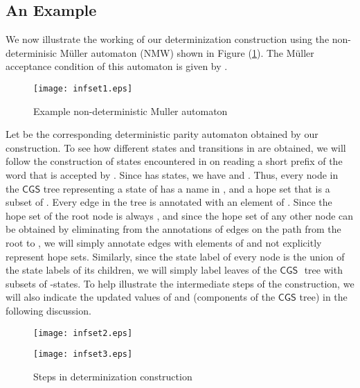 \documentclass[3p]{elsarticle}
\newcommand{\CGS}{\ensuremath{\textsf{CGS }}}
\begin{document}
\subsection{An Example}
\label{sec:inf-set-example}
We now illustrate the working of our determinization construction
using the non-determinisic M\"{u}ller automaton (NMW)  shown in
Figure (\ref{infset1}).  The M\"{u}ller acceptance condition of this
automaton is given by .
\begin{figure}[ht]
\begin{center}
\texttt{[image: infset1.eps]}
\end{center}
\caption{Example non-deterministic Muller automaton}
\label{infset1}
\end{figure}
Let  be the corresponding deterministic parity automaton obtained
by our construction.  To see how different states and transitions in
 are obtained, we will follow the construction of states
encountered in  on reading a short prefix of the word
 that is accepted by .  Since  has  states,
we have  and .  Thus, every node in the
\CGS tree representing a state of  has a name in , and a
hope set that is a subset of .  Every edge in the tree is
annotated with an element of .  Since the hope set
of the root node is always , and since the hope set of any other
node  can be obtained by eliminating from  the annotations of
edges on the path from the root to , we will simply annotate edges
with elements of  and not explicitly represent hope sets.
Similarly, since the state label of every node is the union of the
state labels of its children, we will simply label leaves of the \CGS
tree with subsets of -states.  To help illustrate the
intermediate steps of the construction, we will also indicate the
updated values of  and  (components of the \CGS tree) in the
following discussion.
\begin{figure}[ht]
\begin{minipage}[b]{0.48\linewidth}
\begin{center}
\texttt{[image: infset2.eps]}
\end{center}
\label{infset2}
\end{minipage}
\hspace{5mm}
\begin{minipage}[b]{0.48\linewidth}
\begin{center}
\texttt{[image: infset3.eps]}
\end{center}
\label{infset3}
\end{minipage}
\caption{Steps in determinization construction}
\label{infset23}
\end{figure}
\end{document}
